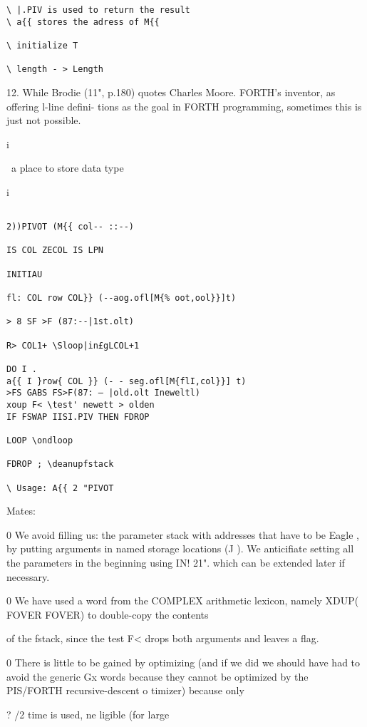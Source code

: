 {{{{{{{{{{\begin{verbatim}
\ |.PIV is used to return the result
\ a{{ stores the adress of M{{

\ initialize T

\ length - > Length

\end{verbatim} 

12. While Brodie (11", p.180) quotes Charles Moore. FORTH's inventor, as offering l-line deﬁni-
tions as the goal in FORTH programming, sometimes this is just not possible.

i

\ a place to store data type

i

 



\begin{verbatim}

2))PIVOT (M{{ col-- ::--)

IS COL ZECOL IS LPN

INITIAU

fl: COL row COL}} (--aog.ofl[M{% oot,ool}}]t)

> 8 SF >F (87:--|1st.olt)

R> COL1+ \Sloop|in£gLCOL+1

DO I .
a{{ I }row{ COL }} (- - seg.ofl[M{flI,col}}] t)
>FS GABS FS>F(87: — |old.olt Ineweltl)
xoup F< \test' newett > olden
IF FSWAP IISI.PIV THEN FDROP

LOOP \ondloop

FDROP ; \deanupfstack

\ Usage: A{{ 2 "PIVOT
\end{verbatim}

Mates:

0 We avoid ﬁlling us: the parameter stack with addresses that
have to be Eagle , by putting arguments in named storage
locations (J ). We anticiﬁate setting all the parameters in
the beginning using IN! 21". which can be extended later
if necessary.

0 We have used a word from the COMPLEX arithmetic lexicon,
namely XDUP( FOVER FOVER) to double-copy the contents

of the fstack, since the test F< drops both arguments and
leaves a flag.

0 There is little to be gained by optimizing (and if we did we
should have had to avoid the generic Gx words because they
cannot be optimized by the PIS/FORTH recursive-descent
o timizer) because only}? /2 time is used, ne ligible (for large

}}}}}}}}}

